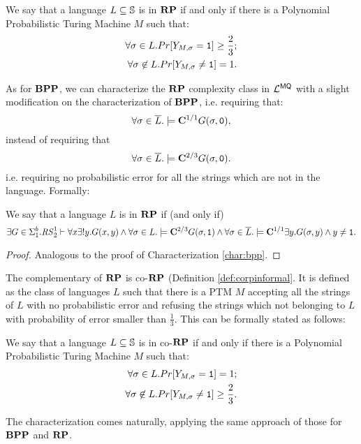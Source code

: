 \begin{defn}[$\RP$]
\label{def:rp}
We say that a language $L\subseteq \mathbb{S}$ is in $\RP$ if and only if
there is a
Polynomial Probabilistic Turing Machine
$M$ such that:
\begin{align*}
\forall \sigma \in L. Pr[Y_{M,\sigma} = \mathtt{1}]\ge \frac 2 3;\\
\forall \sigma \not\in L. Pr[Y_{M,\sigma} \neq \mathtt{1}]= 1.
\end{align*}
\end{defn}
\noindent
%
As for $\mathbf{BPP}$, we can characterize the $\RP$ complexity class in $\mathcal{L}^{\mathsf{MQ}}$ with
a slight modification
on the characterization of $\mathbf{BPP}$, i.e. requiring that:
$$
\forall \sigma \in \overline L.\models \mathbf{C}^{1/1} G(\sigma, \mathtt{0}),
$$
instead of requiring that
$$
\forall \sigma \in \overline L.\models \mathbf{C}^{2/3} G(\sigma, \mathtt{0}).
$$
i.e. requiring no probabilistic error for all the strings which are not in the language.
Formally:

\begin{characterization}
\label{char:rp}
We say that a language $L$ is in $\RP$ if (and only if)
\[
\exists G \in \Sigma^b_1.{\mathit{RS}^1_2} \vdash \forall x \exists ! y. G(x, y)\land \forall \sigma \in L.\models \mathbf{C}^{2/3} G(\sigma, \mathtt{1}) \land \forall \sigma \in \overline L.\models \mathbf{C}^{1/1} \exists y. G(\sigma, y) \land y \neq \mathtt{1}.
\]
\end{characterization}

\begin{proof}
  Analogous to the proof of Characterization \ref{char:bpp}.
\end{proof}

\noindent
The complementary of $\RP$ is co-$\RP$ (Definition \ref{def:corpinformal}.
It is defined as the class of
languages $L$ such that there is a PTM $M$ accepting all the strings of $L$
with no probabilistic error and refusing the strings which not belonging to $L$
with probability of error smaller than $\frac 1 3$. This can be formally
stated as follows:

\begin{defn}[co-$\RP$]
\label{def:corp}
We say that a language $L\subseteq \mathbb{S}$ is in co-$\RP$ if and only if
there is a
Polynomial Probabilistic Turing Machine
$M$ such that:
\begin{align*}
\forall \sigma \in L. Pr[Y_{M,\sigma} = \mathtt{1}]=1;\\
\forall \sigma \not\in L. Pr[Y_{M,\sigma} \neq \mathtt{1}]\ge \frac 2 3.
\end{align*}
\end{defn}
\noindent
The characterization comes naturally, applying the same approach of
those for $\mathbf{BPP}$ and $\RP$.

